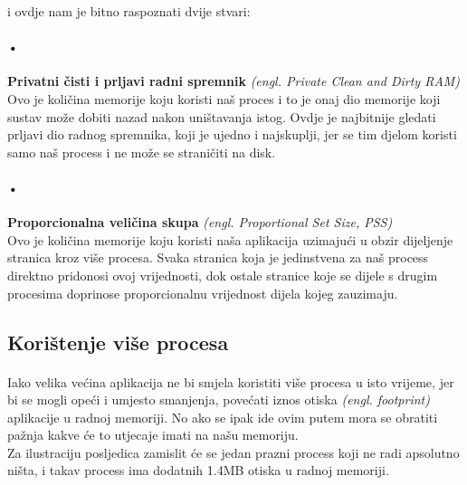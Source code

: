 \documentclass[times, utf8, zavrsni]{fer}
\begin{document}
\noindent
i ovdje nam je bitno raspoznati dvije stvari:


\paragraph{•}
\textbf{Privatni čisti i prljavi radni spremnik} \textit{(engl. Private Clean and Dirty RAM)}\\
Ovo je količina memorije koju koristi naš proces i to je onaj dio memorije koji sustav može dobiti nazad nakon uništavanja istog. Ovdje je najbitnije gledati prljavi dio radnog spremnika, koji je ujedno i najskuplji, jer se tim djelom koristi samo naš process i ne može se straničiti na disk.

\paragraph{•}
\textbf{Proporcionalna veličina skupa} \textit{(engl. Proportional Set Size, PSS)}\\
Ovo je količina memorije koju koristi naša aplikacija uzimajući u obzir dijeljenje stranica kroz više procesa. Svaka stranica koja je jedinstvena za naš process direktno pridonosi ovoj vrijednosti, dok ostale stranice koje se dijele s drugim procesima doprinose proporcionalnu vrijednost dijela kojeg zauzimaju.

\subsection{Korištenje više procesa}
\paragraph{}
Iako velika većina aplikacija ne bi smjela koristiti više procesa u isto vrijeme, jer bi se mogli opeći i umjesto smanjenja, povećati iznos otiska \textit{(engl. footprint)} aplikacije u radnoj memoriji. No ako se ipak ide ovim putem mora se obratiti pažnja kakve će to utjecaje imati na našu memoriju.\\

Za ilustraciju posljedica zamislit će se jedan prazni process koji ne radi apsolutno ništa, i takav process ima dodatnih 1.4MB otiska u radnoj memoriji.
\end{document}
